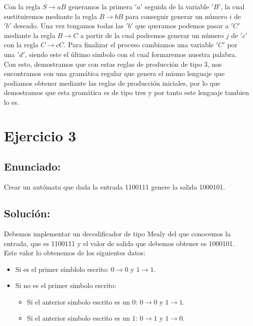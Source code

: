 \documentclass[10pt,a4paper,spanish]{report}
\begin{document}
\noindent
Con la regla $S \rightarrow aB$ generamos la primera $'a'$ seguida de la variable $'B'$, la cual sustituiremos mediante la regla $B \rightarrow bB$ para conseguir generar un número $i$ de $'b'$ deseado. Una vez tengamos todas las $'b'$ que queramos podemos pasar a $'C'$ mediante la regla $B \rightarrow C$ a partir de la cual podremos generar un número $j$ de $'c'$ con la regla $C \rightarrow cC$. Para finalizar el proceso cambiamos una variable $'C'$ por una $'d'$, siendo este el último simbolo con el cual formaremos nuestra palabra. \\

\noindent
Con esto, demostramos que con estas reglas de producción de tipo 3, nos encontramos con una gramática regular que genera el mismo lenguaje que podiamos obtener mediante las reglas de producción iniciales, por lo que demostramos que esta gramática es de tipo tres y por tanto este lenguaje tambien lo es.


\chapter{Ejercicio 3}

\section{Enunciado:}

\noindent
Crear un autómata que dada la entrada 1100111 genere la salida 1000101.

\section{Solución:}
\noindent
Debemos implementar un decodificador de tipo Mealy del que conocemos la entrada, que es 1100111 y el valor de salida que debemos obtener es 1000101. Este valor lo obtenemos de los siguientes datos:

\begin{itemize}
	\item Si es el primer símblolo escrito: $0 \rightarrow 0$ y $1 \rightarrow 1$.
	\item Si no es el primer simbolo escrito:
	      \begin{itemize}
	      	\item Si el anterior simbolo escrito es un 0: $0 \rightarrow 0$ y $1 \rightarrow 1$.
	      	\item Si el anterior simbolo escrito es un 1: $0 \rightarrow 1$ y $1 \rightarrow 0$.
	      \end{itemize}
\end{itemize}
\end{document}
